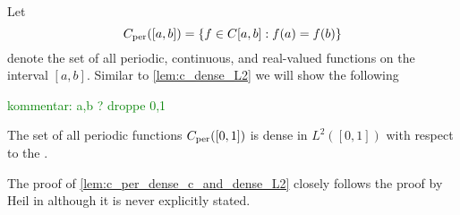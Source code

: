 \documentclass[../thesis.tex]{subfiles}
\begin{document}

Let
\begin{equation*}
    C_{\text{per}}([a,b])=\{f \in C[a,b]: f(a)=f(b)\}
\end{equation*}
denote the set of all periodic, continuous, and real-valued functions on the interval $[a,b]$. Similar to \cref{lem:c_dense_L2} we will show the following

\textcolor{green}{kommentar: a,b ? droppe 0,1} %
\begin{lemma}\label{lem:c_per_dense_c_and_dense_L2}
    The set of all periodic functions $C_{\text{per}}([0,1])$ is dense in $L^2([0,1])$ with respect to the \Ltwonorm.
\end{lemma}
The proof of \cref{lem:c_per_dense_c_and_dense_L2} closely follows the proof by Heil in \cite[p.~228]{heilMetricsNormsInner2018} although it is never explicitly stated. 
\end{document}

